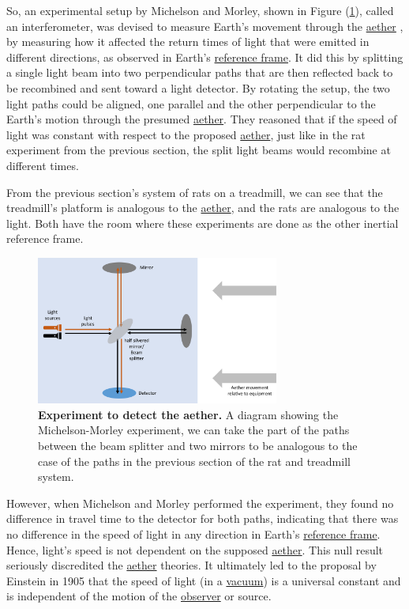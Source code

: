 So, an experimental setup by Michelson and Morley, shown in Figure (\ref{fig: Michelson_morley}), called an interferometer, was devised to measure Earth's movement through the \hyperlink{def-aether}{aether} \cite{EtherExperiment}, by measuring how it affected the return times of light that were emitted in different directions, as observed in Earth's \hyperlink{def-Reference-frame}{reference frame}.
It did this by splitting a single light beam into two perpendicular paths that are then reflected back to be recombined and sent toward a light detector.
By rotating the setup, the two light paths could be aligned, one parallel and the other perpendicular to the Earth's motion through the presumed \hyperlink{def-aether}{aether}.
They reasoned that if the speed of light was constant with respect to the proposed \hyperlink{def-aether}{aether}, just like in the rat experiment from the previous section, the split light beams would recombine at different times.

From the previous section's system of rats on a treadmill, we can see that the treadmill's platform is analogous to the \hyperlink{def-aether}{aether}, and the rats are analogous to the light.
Both have the room where these experiments are done as the other inertial reference frame.

\begin{figure}[H]
	\centering
	\includegraphics[width = 8cm]{images/pdf/Michelson_morley.pdf}
	\caption{\textbf{Experiment to detect the aether.} A diagram showing the Michelson-Morley experiment, we can take the part of the paths between the beam splitter and two mirrors to be analogous to the case of the paths in the previous section of the rat and treadmill system.}
	\label{fig: Michelson_morley}
\end{figure}

However, when Michelson and Morley performed the experiment, they found no difference in travel time to the detector for both paths, indicating that there was no difference in the speed of light in any direction in Earth's \hyperlink{def-Reference-frame}{reference frame}.
Hence, light's speed is not dependent on the supposed \hyperlink{def-aether}{aether}.
This null result seriously discredited the \hyperlink{def-aether}{aether} theories.
It ultimately led to the proposal by Einstein in 1905 that the speed of light (in a \hyperlink{def-vacuum}{vacuum}) is a universal constant and is independent of the motion of the \hyperlink{def-observer}{observer} or source.

